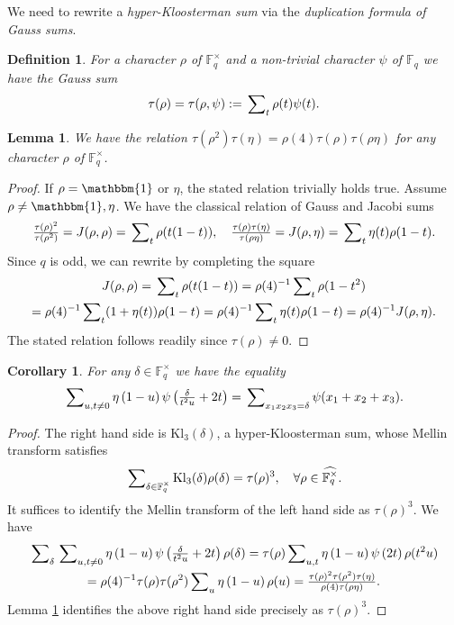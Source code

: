 \documentclass[A4]{amsart}
\newtheorem{definition} [theorem] {Definition}
\newtheorem{lemma}      [theorem]{Lemma}
\newtheorem{corollary}  [theorem]{Corollary}
\numberwithin{equation}{section} \everymath{\displaystyle}
\newcommand{\id}{\mathbbm{1}}
\newcommand{\Kl}{\mathrm{Kl}}
\newcommand{\fF}{\mathbb{F}}
\begin{document}
	We need to rewrite a \emph{hyper-Kloosterman sum} via the \emph{duplication formula of Gauss sums}.
\begin{definition}
	For a character $\rho$ of $\fF_q^{\times}$ and a non-trivial character $\psi$ of $\fF_q$ we have the Gauss sum
	$$ \tau(\rho) = \tau(\rho, \psi) := \sideset{}{_t} \sum \rho(t) \psi(t). $$
\end{definition}
\begin{lemma} \label{lem: DupFGS}
	We have the relation $\tau(\rho^2) \tau(\eta) = \rho(4) \tau(\rho) \tau(\rho \eta)$ for any character $\rho$ of $\fF_q^{\times}$.
\end{lemma}
\begin{proof}
	If $\rho = \id$ or $\eta$, the stated relation trivially holds true. Assume $\rho \neq \id, \eta$. We have the classical relation of Gauss and Jacobi sums \cite[\S 8.3 Theorem 1]{IR90}
	$$ \tfrac{\tau(\rho)^2}{\tau(\rho^2)} = J(\rho,\rho) = \sideset{}{_t} \sum \rho(t(1-t)), \quad \tfrac{\tau(\rho)\tau(\eta)}{\tau(\rho \eta)} = J(\rho,\eta) = \sideset{}{_t} \sum \eta(t) \rho(1-t). $$
	Since $q$ is odd, we can rewrite by completing the square
\begin{multline*}
	J(\rho,\rho) = \sideset{}{_t} \sum \rho(t(1-t)) = \rho(4)^{-1} \sideset{}{_t} \sum \rho(1-t^2) \\
	= \rho(4)^{-1} \sideset{}{_t} \sum (1+\eta(t)) \rho(1-t) = \rho(4)^{-1} \sideset{}{_t} \sum \eta(t) \rho(1-t) = \rho(4)^{-1} J(\rho,\eta).
\end{multline*}
	The stated relation follows readily since $\tau(\rho) \neq 0$.
\end{proof}
\begin{corollary} \label{cor: HypKlSVar}
	For any $\delta \in \fF_q^{\times}$ we have the equality
	$$ \sideset{}{_{u,t \neq 0}} \sum \eta \left( 1-u \right) \psi \left( \tfrac{\delta}{t^2u} + 2t \right) = \sideset{}{_{x_1x_2x_3 = \delta}} \sum \psi(x_1+x_2+x_3). $$
\end{corollary}
\begin{proof}
	The right hand side is $\Kl_3(\delta)$, a hyper-Kloosterman sum, whose Mellin transform satisfies
	$$ \sideset{}{_{\delta \in \fF_q^{\times}}} \sum \Kl_3(\delta) \rho(\delta) = \tau(\rho)^3, \quad \forall \rho \in \widehat{\fF_q^{\times}}. $$
	It suffices to identify the Mellin transform of the left hand side as $\tau(\rho)^3$. We have
\begin{multline*}
	\sideset{}{_{\delta}} \sum \sideset{}{_{u,t \neq 0}} \sum \eta \left( 1-u \right) \psi \left( \tfrac{\delta}{t^2u} + 2t \right) \rho(\delta) = \tau(\rho) \sideset{}{_{u,t}} \sum \eta \left( 1-u \right) \psi \left( 2t \right) \rho(t^2u) \\
	= \rho(4)^{-1} \tau(\rho) \tau(\rho^2) \sideset{}{_u} \sum \eta \left( 1-u \right) \rho(u) = \tfrac{\tau(\rho)^2 \tau(\rho^2) \tau(\eta)}{\rho(4) \tau(\rho \eta)}.
\end{multline*}
	Lemma \ref{lem: DupFGS} identifies the above right hand side precisely as $\tau(\rho)^3$.
\end{proof}
\end{document}
